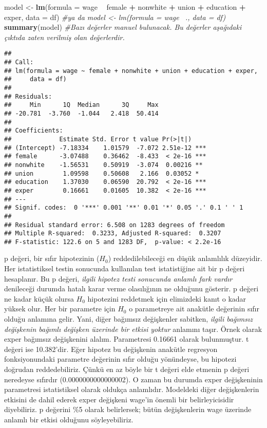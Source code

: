 \documentclass[
]{book}
\newenvironment{Shaded}{\begin{snugshade}}{\end{snugshade}}
\newcommand{\CommentTok}[1]{\textcolor[rgb]{0.56,0.35,0.01}{\textit{#1}}}
\newcommand{\DataTypeTok}[1]{\textcolor[rgb]{0.13,0.29,0.53}{#1}}
\newcommand{\KeywordTok}[1]{\textcolor[rgb]{0.13,0.29,0.53}{\textbf{#1}}}
\newcommand{\NormalTok}[1]{#1}
\newcommand{\OperatorTok}[1]{\textcolor[rgb]{0.81,0.36,0.00}{\textbf{#1}}}
\newcommand{\StringTok}[1]{\textcolor[rgb]{0.31,0.60,0.02}{#1}}
\begin{document}
\begin{Shaded}
\begin{Highlighting}[]
\NormalTok{model <-}\StringTok{ }\KeywordTok{lm}\NormalTok{(}\DataTypeTok{formula =}\NormalTok{ wage }\OperatorTok{~}\StringTok{ }\NormalTok{female }\OperatorTok{+}\StringTok{ }\NormalTok{nonwhite }\OperatorTok{+}\StringTok{ }\NormalTok{union }\OperatorTok{+}\StringTok{ }\NormalTok{education }\OperatorTok{+}\StringTok{ }\NormalTok{exper, }\DataTypeTok{data =}\NormalTok{ df)}
\CommentTok{#ya da model <- lm(formula = wage ~., data = df)}
\KeywordTok{summary}\NormalTok{(model) }\CommentTok{#Bazı değerler manuel bulunacak. Bu değerler aşağıdaki çıktıda zaten verilmiş olan değerlerdir.}
\end{Highlighting}
\end{Shaded}

\begin{verbatim}
## 
## Call:
## lm(formula = wage ~ female + nonwhite + union + education + exper, 
##     data = df)
## 
## Residuals:
##     Min      1Q  Median      3Q     Max 
## -20.781  -3.760  -1.044   2.418  50.414 
## 
## Coefficients:
##             Estimate Std. Error t value Pr(>|t|)    
## (Intercept) -7.18334    1.01579  -7.072 2.51e-12 ***
## female      -3.07488    0.36462  -8.433  < 2e-16 ***
## nonwhite    -1.56531    0.50919  -3.074  0.00216 ** 
## union        1.09598    0.50608   2.166  0.03052 *  
## education    1.37030    0.06590  20.792  < 2e-16 ***
## exper        0.16661    0.01605  10.382  < 2e-16 ***
## ---
## Signif. codes:  0 '***' 0.001 '**' 0.01 '*' 0.05 '.' 0.1 ' ' 1
## 
## Residual standard error: 6.508 on 1283 degrees of freedom
## Multiple R-squared:  0.3233, Adjusted R-squared:  0.3207 
## F-statistic: 122.6 on 5 and 1283 DF,  p-value: < 2.2e-16
\end{verbatim}

p değeri, bir sıfır hipotezinin (\(H_0\)) reddedilebileceği en düşük anlamlılık düzeyidir. Her istatistiksel testin sonucunda kullanılan test istatistiğine ait bir p değeri hesaplanır. Bu p değeri, \emph{ilgili hipotez testi sonucunda anlamlı fark vardır} denileceği durumda hatalı karar verme olasılığının ne olduğunu gösterir. p değeri ne kadar küçük olursa \(H_0\) hipotezini reddetmek için elimizdeki kanıt o kadar yüksek olur. Her bir parametre için \(H_0\) o parametreye ait anakütle değerinin sıfır olduğu anlamına gelir. Yani, diğer bağımsız değişkenler sabitken, \emph{ilgili bağımsız değişkenin bağımlı değişken üzerinde bir etkisi yoktur} anlamını taşır. Örnek olarak exper bağımsız değişkenini alalım. Parametresi 0.16661 olarak bulunmuştur. t değeri ise 10.382'dir. Eğer hipotez bu değişkenin anakütle regresyon fonksiyonundaki parametre değerinin sıfır olduğu yönündeyse, bu hipotezi doğrudan reddedebiliriz. Çünkü en az böyle bir t değeri elde etmenin p değeri neredeyse sıfırdır (0.0000000000000002). O zaman bu durumda exper değişkeninin parametresi istatistiksel olarak oldukça anlamlıdır. Modeldeki diğer değişkenlerin etkisini de dahil ederek exper değişkeni wage'in önemli bir belirleyicisidir diyebiliriz. p değerini \%5 olarak belirlersek; bütün değişkenlerin wage üzerinde anlamlı bir etkisi olduğunu söyleyebiliriz.
\end{document}
